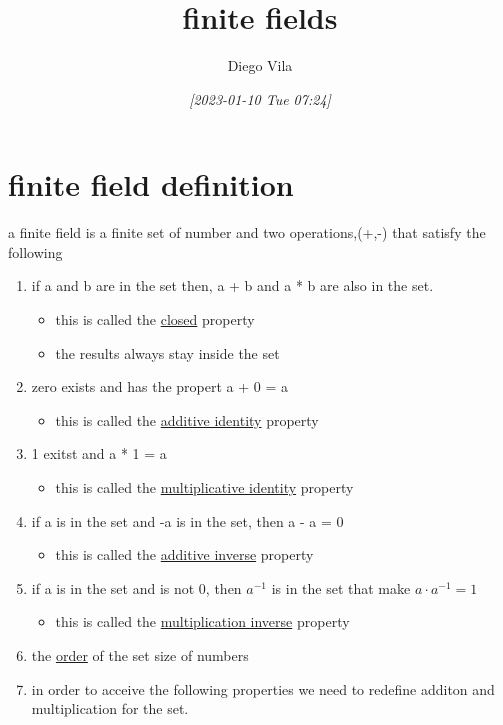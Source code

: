 \documentclass[11pt]{article}
\author{Diego Vila}
\date{\textit{[2023-01-10 Tue 07:24]}}
\title{finite fields}
\begin{document}
\maketitle
\tableofcontents


\section{finite field definition}
\label{sec:org78192f1}

a finite field is a finite set of number and two operations,(+,-) that satisfy the following

\begin{enumerate}
\item if a and b are in the set then, a + b and a * b are also in the set.
\begin{itemize}
\item this is called the \uline{closed} property
\item the results always stay inside the set
\end{itemize}

\item zero exists and has the propert a + 0 = a
\begin{itemize}
\item this is called the \uline{additive identity} property
\end{itemize}

\item 1 exitst and a * 1 = a
\begin{itemize}
\item this is called the \uline{multiplicative identity} property
\end{itemize}

\item if a is in the set and -a is in the set, then a - a = 0
\begin{itemize}
\item this is called the \uline{additive inverse} property
\end{itemize}

\item if a is in the set and is not 0, then \(a^{-1}\) is in the set that make \(a \cdot a^{-1} = 1\)
\begin{itemize}
\item this is called the \uline{multiplication inverse} property
\end{itemize}

\item the \uline{order} of the set size of numbers

\item in order to acceive the following properties we need to redefine additon and multiplication for the set.
\end{enumerate}
\end{document}

